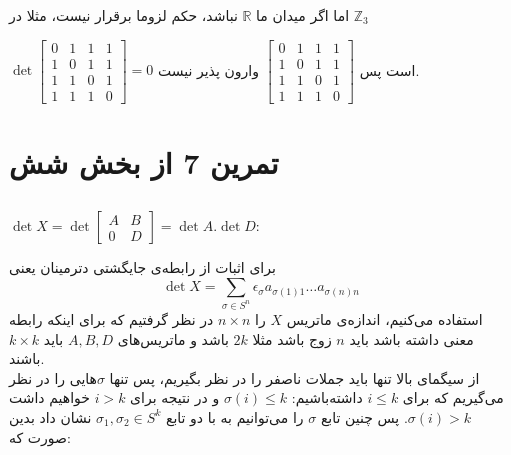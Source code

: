 \documentclass[12pt,a4paper]{article}
\begin{document}
اما اگر میدان ما $\mathbb{R}$ نباشد، حکم لزوما برقرار نیست، مثلا در 
$\mathbb{Z}_3$

$\det \begin{bmatrix}
	0&1&1&1\\
	1&0&1&1\\
	1&1&0&1\\
	1&1&1&0
\end{bmatrix} = 0$
است پس
$\begin{bmatrix}
0&1&1&1\\
1&0&1&1\\
1&1&0&1\\
1&1&1&0
\end{bmatrix}$
 وارون پذیر نیست.
 
\section{تمرین 7 از بخش شش}
\subsection{}
$\det X = \det\begin{bmatrix}
	A&B\\
	0&D
	\end{bmatrix} = \det A . \det D$:

برای اثبات از رابطه‌ی جایگشتی دترمینان یعنی 
$$\det X = \sum_{\sigma \in S^n} \epsilon_\sigma a_{\sigma(1)1}\dots a_{\sigma(n)n}$$
استفاده می‌کنیم، اندازه‌ی ماتریس $X$ را $n\times n$ در نظر گرفتیم که برای اینکه رابطه معنی داشته باشد باید $n$ زوج باشد مثلا $2k$ باشد و ماتریس‌های $A, B, D$ باید $k\times k$ باشند.
\\
از سیگمای بالا تنها باید جملات ناصفر را در نظر بگیریم، پس تنها $\sigma$هایی را در نظر می‌گیریم که برای $i \leq k$ داشته‌باشیم: $\sigma(i) \leq k$ و در نتیجه برای $i > k$ خواهیم داشت $\sigma(i) > k$. پس چنین تابع $\sigma$ را می‌توانیم به با دو تابع $\sigma_1, \sigma_2 \in S^k$ نشان داد بدین صورت که:
\end{document}
